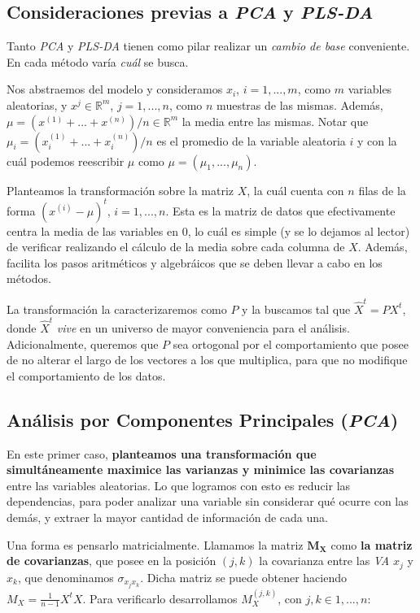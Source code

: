 \subsection{Consideraciones previas a \textit{PCA} y \textit{PLS-DA}}\label{intro_consideraciones}

Tanto \textit{PCA} y \textit{PLS-DA} tienen como pilar realizar un \textit{cambio de base} conveniente. En cada m\'etodo var\'ia \textit{cu\'al} se busca. 

Nos abstraemos del modelo y consideramos $x_{i}$, $i = 1, ..., m$, como $m$ variables aleatorias, y $x^{j} \in \mathbb{R}^m$, $j = 1, ..., n$, como $n$ muestras de las mismas. Adem\'as, $\mu = (x^{(1)} + ... + x^{(n)}) / n \in \mathbb{R}^{m}$ la media entre las mismas. Notar que $\mu_{i} = (x^{(1)}_{i} + ... + x^{(n)}_{i}) / n$ es el promedio de la variable aleatoria $i$ y con la cu\'al podemos reescribir $\mu$ como $\mu = (\mu_{1}, ..., \mu_{n})$.

Planteamos la transformaci\'on sobre la matriz $X$, la cu\'al cuenta con $n$ filas de la forma $(x^{(i)} - \mu)^t$, $i = 1, ..., n$. Esta es la matriz de datos que efectivamente centra la media de las variables en $0$, lo cu\'al es simple (y se lo dejamos al lector) de verificar realizando el c\'alculo de la media sobre cada columna de $X$. Adem\'as, facilita los pasos aritm\'eticos y algebr\'aicos que se deben llevar a cabo en los m\'etodos.

La transformaci\'on la caracterizaremos como $P$ y la buscamos tal que $\hat{X}^{t} = PX^{t}$, donde $\hat{X}^{t}$ \textit{vive} en un universo de mayor conveniencia para el an\'alisis. Adicionalmente, queremos que $P$ sea ortogonal por el comportamiento que posee de no alterar el largo de los vectores a los que multiplica, para que no modifique el comportamiento de los datos.

\subsection{An\'alisis por Componentes Principales (\textit{PCA})} \label{intro_PCA}

En este primer caso, \textbf{planteamos una transformaci\'on que simult\'aneamente maximice las varianzas y minimice las covarianzas} entre las variables aleatorias. Lo que logramos con esto es reducir las dependencias, para poder analizar una variable sin considerar qu\'e ocurre con las dem\'as, y extraer la mayor cantidad de informaci\'on de cada una.

Una forma es pensarlo matricialmente. Llamamos la matriz $\mathbf{M_{X}}$ como \textbf{la matriz de covarianzas}, que posee en la posici\'on $(j, k)$ la covarianza entre las \textit{VA} $x_{j}$ y $x_{k}$, que denominamos $\sigma_{x_{j}x_{k}}$. Dicha matriz se puede obtener haciendo $M_{X} = \frac{1}{n - 1}X^{t}X$. Para verificarlo desarrollamos  $M_{X}^{(j,k)}$, con $j,k \in {1, ..., n}$: \\

